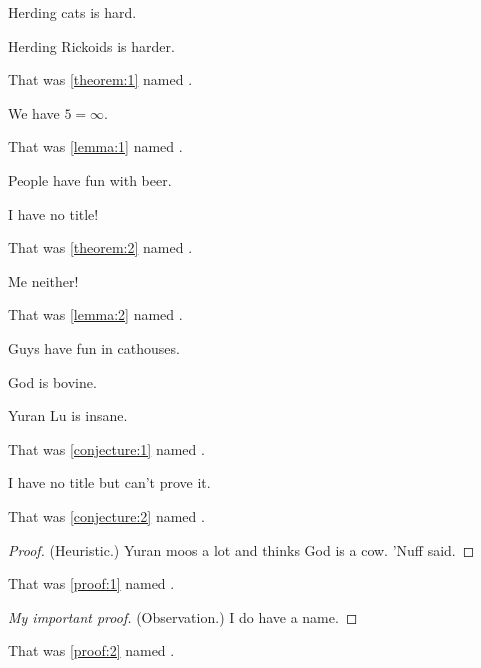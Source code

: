     \begin{theorem}
    Herding cats is hard.
    \end{theorem}

    \begin{theorem}[Cain, 2002]\label{theorem:1}
    Herding Rickoids is harder.
    \end{theorem}
    That was \ref{theorem:1} named .

    \begin{lemma}\label{lemma:1}
    We have $5=\infty$.
    \end{lemma}
    That was \ref{lemma:1} named .

    \begin{theorem}[Wolfenstein, 1572]
    People have fun with beer.
    \end{theorem}

    \begin{theorem}\label{theorem:2}
    I have no title!
    \end{theorem}
    That was \ref{theorem:2} named .

    \begin{lemma}\label{lemma:2}
    Me neither!
    \end{lemma}
    That was \ref{lemma:2} named .

    \begin{lemma}[Ventura, 1992]
    Guys have fun in cathouses.
    \end{lemma}

    \begin{theorem}[Lu, 2000]
    God is bovine.
    \end{theorem}

    \begin{conjecture}[Mihelich, 2002]\label{conjecture:1}
    Yuran Lu is insane.
    \end{conjecture}
    That was \ref{conjecture:1} named .

    \begin{conjecture}\label{conjecture:2}
    I have no title but can't prove it.
    \end{conjecture}
    That was \ref{conjecture:2} named .

    \begin{proof}\label{proof:1}
    (Heuristic.) Yuran moos a lot and thinks God is a cow. ’Nuff said.
    \end{proof}
    That was \ref{proof:1} named .

    \begin{proof}[My important proof]\label{proof:2}
    (Observation.) I do have a name.
    \end{proof}
    That was \ref{proof:2} named .